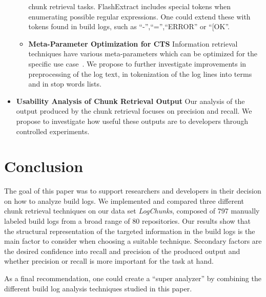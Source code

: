 \begin{itemize}
\begin{itemize}
      chunk retrieval tasks.
      FlashExtract includes special tokens when
      enumerating possible regular expressions.
      One could extend these
      with tokens found in build logs, such as ``-'',``='',``ERROR''
      or ``[OK''.
      \item \textbf{Meta-Parameter Optimization for CTS} Information
      retrieval techniques have various meta-parameters which can be
      optimized for the specific use
      case~\cite{panichella2016parameterizing}.
      We propose to further
      investigate improvements in preprocessing of the log text, in
      tokenization of the log lines into terms and in stop words
      lists.
    \end{itemize}
  \item \textbf{Usability Analysis of Chunk Retrieval Output} Our
  analysis of the output produced by the chunk retrieval focuses on
  precision and recall.
We propose to investigate how useful these
  outputs are to developers through controlled experiments.
\end{itemize}


\section{Conclusion}
\label{sec:conclusion-fw}
The goal of this paper was to support researchers and developers in
their decision on how to analyze build logs.
We implemented and
compared three different chunk retrieval techniques on our data set
\emph{LogChunks}, composed of 797 manually labeled build logs from a
broad range of 80 repositories.
Our results show that the structural
representation of the targeted information in the build logs is the
main factor to consider when choosing a suitable technique.
Secondary
factors are the desired confidence into recall and precision of the
produced output and whether precision or recall is more important for
the task at hand.

As a final recommendation, one could create a ``super analyzer'' by
combining the different build log analysis techniques studied in this
paper.
